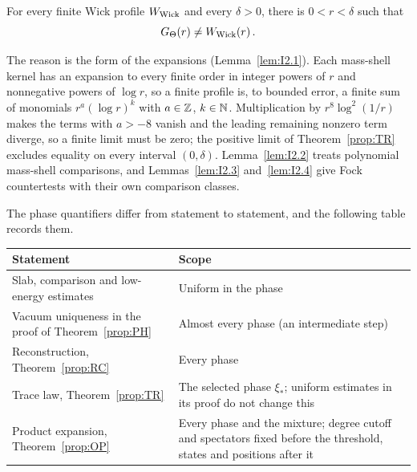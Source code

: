 \begin{proposition}\label{prop:NF}
For every finite Wick profile $W_{\rm Wick}$ and every $\delta>0$, there is $0<r<\delta$ such that
\begin{equation*}
G_{\Theta}(r)\ne W_{\rm Wick}(r)\,.
\end{equation*}
\end{proposition}

The reason is the form of the expansions (Lemma~\ref{lem:I2.1}). Each mass-shell kernel has an expansion to every finite order in integer powers of $r$ and nonnegative powers of $\log r$, so a finite profile is, to bounded error, a finite sum of monomials $r^a(\log r)^k$ with $a\in\mathbb{Z}$, $k\in\mathbb{N}$. Multiplication by $r^8\log^2(1/r)$ makes the terms with $a>-8$ vanish and the leading remaining nonzero term diverge, so a finite limit must be zero; the positive limit of Theorem~\ref{prop:TR} excludes equality on every interval $(0,\delta)$. Lemma~\ref{lem:I2.2} treats polynomial mass-shell comparisons, and Lemmas~\ref{lem:I2.3} and~\ref{lem:I2.4} give Fock countertests with their own comparison classes.

The phase quantifiers differ from statement to statement, and the following table records them.
\begin{center}\small
\begin{tabular}{@{}p{}p{}@{}}
\toprule
Statement & Scope\\
\midrule
Slab, comparison and low-energy estimates & Uniform in the phase\\
Vacuum uniqueness in the proof of Theorem~\ref{prop:PH} & Almost every phase (an intermediate step)\\
Reconstruction, Theorem~\ref{prop:RC} & Every phase\\
Trace law, Theorem~\ref{prop:TR} & The selected phase $\xi_*$; uniform estimates in its proof do not change this\\
Product expansion, Theorem~\ref{prop:OP} & Every phase and the mixture; degree cutoff and spectators fixed before the threshold, states and positions after it\\
\bottomrule
\end{tabular}
\end{center}

